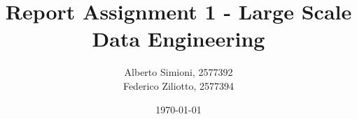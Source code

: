 
\title{Report Assignment 1 - Large Scale Data Engineering}



\author{
Alberto Simioni, 2577392 \\
Federico Ziliotto, 2577394
}\date{\today}







\linespread{1.2}
\setlength{\parindent}{14pt}   %


\ifxetex
{}
\setsansfont{Myriad Pro}

 \setmonofont{Consolas}
\else
  \usepackage[T1]{fontenc}
  \usepackage{newtxtext,newtxmath}
\fi


\newcommand\mycommfont[1]{\scriptsize\ttfamily\textcolor{blue}{#1}}

